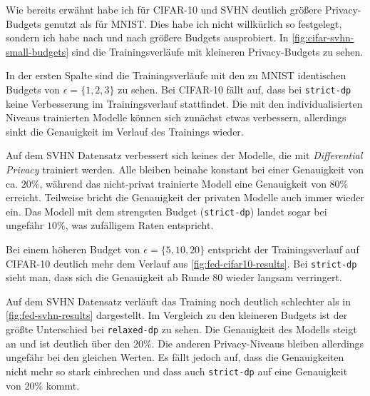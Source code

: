 Wie bereits erwähnt habe ich für CIFAR-10 und SVHN deutlich größere Privacy-Budgets genutzt als für MNIST. Dies habe ich nicht willkürlich so festgelegt, sondern ich habe nach und nach größere Budgets ausprobiert. In \autoref{fig:cifar-svhn-small-budgets} sind die Trainingsverläufe mit kleineren Privacy-Budgets zu sehen.

In der ersten Spalte sind die Trainingsverläufe mit den zu MNIST identischen Budgets von $\epsilon = \{1,2,3\}$ zu sehen. Bei CIFAR-10 fällt auf, dass bei \texttt{strict-dp} keine Verbesserung im Trainingsverlauf stattfindet. Die mit den individualisierten Niveaus trainierten Modelle können sich zunächst etwas verbessern, allerdings sinkt die Genauigkeit im Verlauf des Trainings wieder.

Auf dem SVHN Datensatz verbessert sich keines der Modelle, die mit \textit{Differential Privacy} trainiert werden. Alle bleiben beinahe konstant bei einer Genauigkeit von ca. $20\%$, während das nicht-privat trainierte Modell eine Genauigkeit von $80\%$ erreicht. Teilweise bricht die Genauigkeit der privaten Modelle auch immer wieder ein. Das Modell mit dem strengsten Budget (\texttt{strict-dp}) landet sogar bei ungefähr $10\%$, was zufälligem Raten entspricht.

Bei einem höheren Budget von $\epsilon = \{5, 10, 20\}$ entspricht der Trainingsverlauf auf CIFAR-10 deutlich mehr dem Verlauf aus \autoref{fig:fed-cifar10-results}. Bei \texttt{strict-dp} sieht man, dass sich die Genauigkeit ab Runde $80$ wieder langsam verringert.

Auf dem SVHN Datensatz verläuft das Training noch deutlich schlechter als in \autoref{fig:fed-svhn-results} dargestellt. Im Vergleich zu den kleineren Budgets ist der größte Unterschied bei \texttt{relaxed-dp} zu sehen. Die Genauigkeit des Modells steigt an und ist deutlich über den $20\%$. Die anderen Privacy-Niveaus bleiben allerdings ungefähr bei den gleichen Werten. Es fällt jedoch auf, dass die Genauigkeiten nicht mehr so stark einbrechen und dass auch \texttt{strict-dp} auf eine Genauigkeit von $20\%$ kommt.

